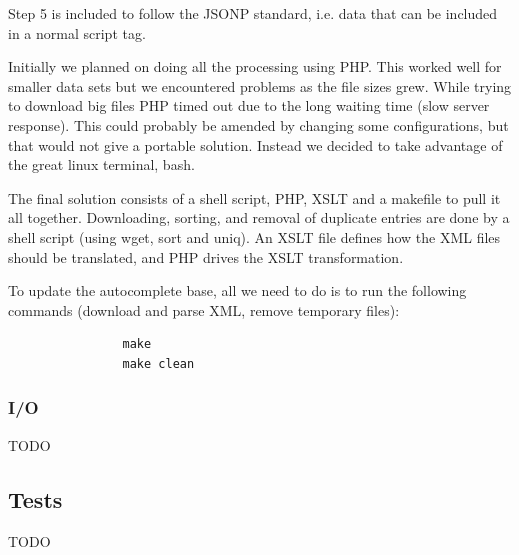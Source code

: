 			Step 5 is included to follow the JSONP standard, i.e. data
			that can be included in a normal script tag.

			Initially we planned on doing all the processing using PHP. This worked
			well for smaller data sets but we encountered problems as the file
			sizes grew. While trying to download big files PHP timed out due to the
			long waiting time (slow server response). This could probably be
			amended by changing some configurations, but that would not give a
			portable solution. Instead we decided to take advantage of the great
			linux terminal, bash.

			The final solution consists of a shell script, PHP, XSLT and a makefile
			to pull it all together.  Downloading, sorting, and removal of
			duplicate entries are done by a shell script (using wget, sort and
			uniq). An XSLT file defines how the XML files should be translated, and
			PHP drives the XSLT transformation.

			To update the autocomplete base, all we need to do is to run the
			following commands (download and parse XML, remove temporary files):
			\begin{lstlisting}
				make
				make clean
			\end{lstlisting}
	\subsubsection{I/O}
		TODO

\subsection{Tests}
	TODO